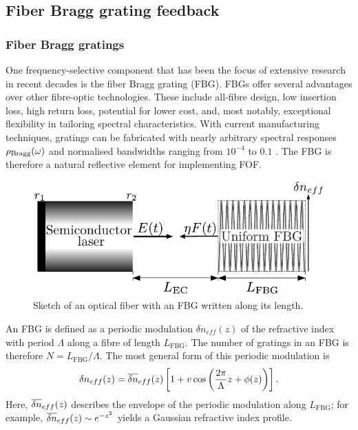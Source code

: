 \subsection*{Fiber Bragg grating feedback}
\label{subsec:FBG_LK}
%
\subsubsection*{Fiber Bragg gratings}
\label{subsubsec:FBG}
%
One frequency-selective component that has been the focus of extensive research in recent decades is the fiber Bragg grating (FBG).
FBGs offer several advantages over other fibre-optic technologies.
These include all-fibre design, low insertion loss, high return loss, potential for lower cost, and, most notably, exceptional flexibility in tailoring spectral characteristics.
With current manufacturing techniques, gratings can be fabricated with nearly arbitrary spectral responses $\rho_\text{Bragg}(\omega)$ and normalised bandwidths ranging from $10^{-4}$ to $0.1$ \cite{erdogan1997fiber}.
The FBG is therefore a natural reflective element for implementing FOF.
%
\begin{figure}
    \centering 
    \includegraphics[width=\linewidth]{Images/FBG_setup_dneff_only_1col.pdf}
    \caption{Sketch of an optical fiber with an FBG written along its length.}
    \label{fig:FBG_setup}
\end{figure}
%
\par
%
An FBG is defined as a periodic modulation $\delta n_{eff}(z)$ of the refractive index with period $\Lambda$ along a fibre of length $L_\text{FBG}$.
The number of gratings in an FBG is therefore $N = L_\text{FBG}/\Lambda$. The most general form of this periodic modulation is
%
\begin{equation}
\label{eq:dneff}
    \delta n_{eff}(z) = \overline{\delta n}_{eff}(z) \left[ 1 + v \cos{\left( \frac{2 \pi}{\Lambda} z + \phi(z) \right)} \right].
\end{equation}
%
Here, $\overline{\delta n}_{eff}(z)$ describes the envelope of the periodic modulation along $L_\text{FBG}$; for example, $\overline{\delta n}_{eff}(z) \sim e^{-z^2}$ yields a Gaussian refractive index profile. 
